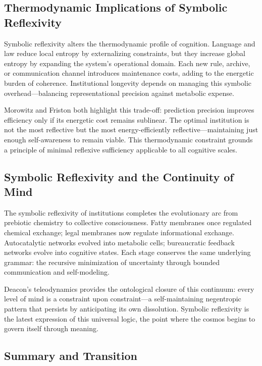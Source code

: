 \documentclass[11pt,a4paper]{article}
\begin{document}
\subsection{Thermodynamic Implications of Symbolic Reflexivity}

Symbolic reflexivity alters the thermodynamic profile of cognition.  Language and law reduce local entropy by externalizing constraints, but they increase global entropy by expanding the system’s operational domain.  Each new rule, archive, or communication channel introduces maintenance costs, adding to the energetic burden of coherence.  Institutional longevity depends on managing this symbolic overhead—balancing representational precision against metabolic expense.  

Morowitz \citep{Morowitz1968EnergyFlowBiology} and Friston \citep{Friston2013LifeAsWeKnowIt} both highlight this trade-off: prediction precision improves efficiency only if its energetic cost remains sublinear.  The optimal institution is not the most reflective but the most energy-efficiently reflective—maintaining just enough self-awareness to remain viable.  This thermodynamic constraint grounds a principle of minimal reflexive sufficiency applicable to all cognitive scales.

\subsection{Symbolic Reflexivity and the Continuity of Mind}

The symbolic reflexivity of institutions completes the evolutionary arc from prebiotic chemistry to collective consciousness.  Fatty membranes once regulated chemical exchange; legal membranes now regulate informational exchange.  Autocatalytic networks evolved into metabolic cells; bureaucratic feedback networks evolve into cognitive states.  Each stage conserves the same underlying grammar: the recursive minimization of uncertainty through bounded communication and self-modeling.

Deacon’s teleodynamics \citep{Deacon2011IncompleteNature} provides the ontological closure of this continuum: every level of mind is a constraint upon constraint—a self-maintaining negentropic pattern that persists by anticipating its own dissolution.  Symbolic reflexivity is the latest expression of this universal logic, the point where the cosmos begins to govern itself through meaning.

\subsection{Summary and Transition}
\end{document}
